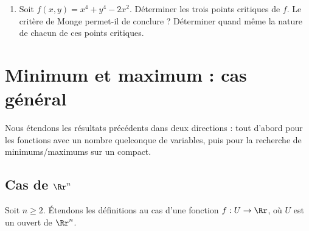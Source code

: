 \begin{enumerate}
        
        \item Soit $f(x,y)=x^4+y^4-2x^2$. Déterminer les trois points critiques de $f$.
        Le critère de Monge permet-il de conclure ?
        Déterminer quand même la nature de chacun de ces points critiques.



    \end{enumerate}

 


\section{Minimum et maximum : cas général}

Nous étendons les résultats précédents dans deux directions : tout d'abord pour les fonctions avec un nombre quelconque de variables, puis pour la recherche de minimums/maximums sur un compact.


\subsection{Cas de $\Rr^n$}

Soit $n\ge2$.
Étendons les définitions au cas d'une fonction $f : U\to \Rr$, o\`u $U$ est un ouvert de $\Rr^n$.

